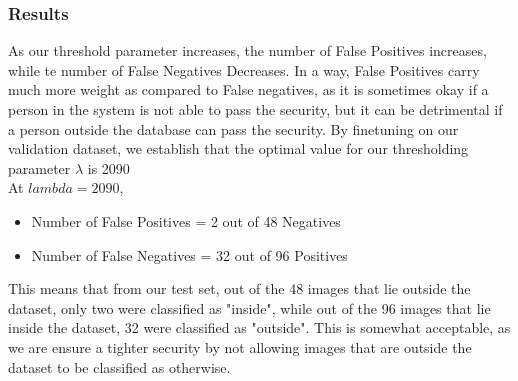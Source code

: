 \documentclass[12pt, a4paper]{article}
\begin{document}
\subsubsection*{Results}
\quad As our threshold parameter increases, the number of False Positives increases, while te number of False Negatives Decreases. In a way, False Positives carry much more weight as compared to False negatives, as it is sometimes okay if a person in the system is not able to pass the security, but it can be detrimental if a person outside the database can pass the security. \newpage
By finetuning on our validation dataset, we  establish that the optimal value for our thresholding parameter $\lambda$ is 2090 \\ 
\null\quad At $lambda = 2090$,
\begin{itemize}
\item Number of False Positives = 2  out of 48 Negatives
\item Number of False Negatives = 32 out of 96 Positives
\end{itemize}

This means that from our test set, out of the 48 images that lie outside the dataset, only two were classified as "inside", while out of the 96 images that lie inside the dataset, 32 were classified as "outside". This is somewhat acceptable, as we are ensure a tighter security by not allowing images that are outside the dataset to be classified as otherwise.


\vspace*{10pt}
\end{document}
